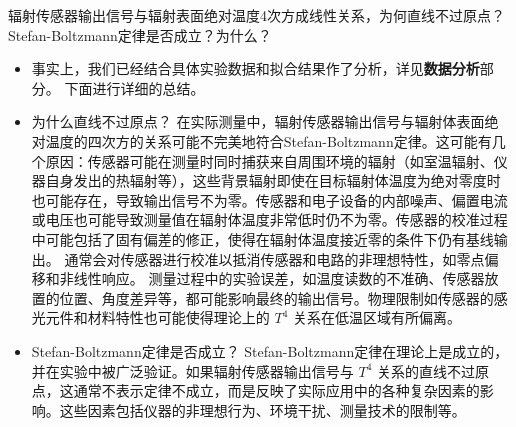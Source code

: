 \documentclass[dvipsnames, svgnames,a4paper,11pt]{article}
\begin{document}
	\begin{question}
		辐射传感器输出信号与辐射表面绝对温度4次方成线性关系，为何直线不过原点？Stefan-Boltzmann定律是否成立？为什么？
	\end{question}
	\begin{itemize}
		\item 事实上，我们已经结合具体实验数据和拟合结果作了分析，详见\textbf{数据分析}部分。
		下面进行详细的总结。
		
		\item  为什么直线不过原点？
		在实际测量中，辐射传感器输出信号与辐射体表面绝对温度的四次方的关系可能不完美地符合Stefan-Boltzmann定律。这可能有几个原因：传感器可能在测量时同时捕获来自周围环境的辐射（如室温辐射、仪器自身发出的热辐射等），这些背景辐射即使在目标辐射体温度为绝对零度时也可能存在，导致输出信号不为零。传感器和电子设备的内部噪声、偏置电流或电压也可能导致测量值在辐射体温度非常低时仍不为零。传感器的校准过程中可能包括了固有偏差的修正，使得在辐射体温度接近零的条件下仍有基线输出。 通常会对传感器进行校准以抵消传感器和电路的非理想特性，如零点偏移和非线性响应。 测量过程中的实验误差，如温度读数的不准确、传感器放置的位置、角度差异等，都可能影响最终的输出信号。物理限制如传感器的感光元件和材料特性也可能使得理论上的 \( T^4 \) 关系在低温区域有所偏离。
		
		\item Stefan-Boltzmann定律是否成立？
		Stefan-Boltzmann定律在理论上是成立的，并在实验中被广泛验证。如果辐射传感器输出信号与 \( T^4 \) 关系的直线不过原点，这通常不表示定律不成立，而是反映了实际应用中的各种复杂因素的影响。这些因素包括仪器的非理想行为、环境干扰、测量技术的限制等。
	\end{itemize}
	
\end{document}
